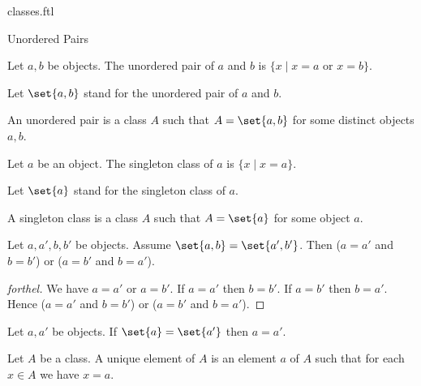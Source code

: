 \documentclass{naproche-library}
\begin{document}
\begin{smodule}[title=Classes]{classes.ftl}
\begin{sfragment}{Unordered Pairs}
  \begin{definition}[forthel,id=FOUNDATIONS_01_3471035364016128]
    Let $a, b$ be objects.
    The unordered pair of $a$ and $b$ is $\{ x \mid x = a$ or $x = b \}$.

    Let $\set{a, b}$ stand for the unordered pair of $a$ and $b$.
  \end{definition}

  \begin{definition}[forthel,id=FOUNDATIONS_01_605432672419840]
    An unordered pair is a class $A$ such that $A = \set{a, b}$ for some distinct objects $a, b$.
  \end{definition}

  \begin{definition}[forthel,id=FOUNDATIONS_01_1160414603771904]
    Let $a$ be an object.
    The singleton class of $a$ is $\{ x \mid x = a \}$.

    Let $\set{a}$ stand for the singleton class of $a$.
  \end{definition}

  \begin{definition}[forthel,id=FOUNDATIONS_01_6786618161627136]
    A singleton class is a class $A$ such that $A = \set{a}$ for some object $a$.
  \end{definition}

  \begin{proposition}[forthel,id=FOUNDATIONS_01_6125259604361216]
    Let $a, a', b, b'$ be objects.
    Assume $\set{a, b} = \set{a', b'}$.
    Then ($a = a'$ and $b = b'$) or ($a = b'$ and $b = a'$).
  \end{proposition}
  \begin{proof}[forthel]
    We have $a = a'$ or $a = b'$.
    If $a = a'$ then $b = b'$.
    If $a = b'$ then $b = a'$.
    Hence ($a = a'$ and $b = b'$) or ($a = b'$ and $b = a'$).
  \end{proof}

  \begin{corollary}[forthel,id=FOUNDATIONS_01_6954678910713856]
    Let $a, a'$ be objects.
    If $\set{a} = \set{a'}$ then $a = a'$.
  \end{corollary}

  \begin{definition}[forthel,id=FOUNDATIONS_01_29867480293464351]
    Let $A$ be a class.
    A unique element of $A$ is an element $a$ of $A$ such that for each $x \in A$ we have $x = a$.
  \end{definition}


\end{sfragment}
\end{smodule}
\end{document}
